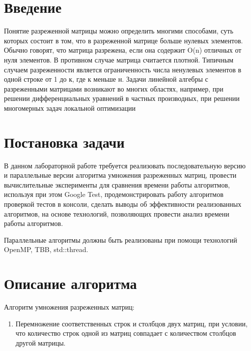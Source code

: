 \documentclass{report}
\begin{document}
\setcounter{page}{2}

\tableofcontents
\newpage

\section*{Введение}
\par Понятие разреженной матрицы можно определить многими способами, суть которых состоит в том, что в разреженной матрице больше нулевых элементов. Обычно говорят, что матрица разрежена, если она содержит  O(n) отличных от нуля элементов. В противном случае матрица считается плотной. Типичным случаем разреженности является ограниченность числа ненулевых элементов в одной строке от 1 до к, где к меньше н. Задачи линейной алгебры с разреженными матрицами возникают во многих областях, например, при решении дифференциальных уравнений в частных производных, при решении многомерных задач локальной оптимизации
\newpage

\section*{Постановка задачи}
\par В данном лабораторной работе требуется реализовать последовательную версию и параллельные версии алгоритма умножения разреженных матриц, провести вычислительные эксперименты для сравнения времени работы алгоритмов, используя при этом Google Test, продемонстрировать работу алгоритмов проверкой тестов в консоли, сделать выводы об эффективности реализованных алгоритмов, на основе технологий, позволяющих провести анализ времени работы алгоритмов.
\par Параллельные алгоритмы должны быть реализованы при помощи технологий OpenMP, TBB, std::thread.
\newpage

\section*{Описание алгоритма}
\par Алгоритм умножения разреженных матриц:
\begin{enumerate}
\item Перемножение соответственных строк и столбцов двух матриц, при условии, что количество строк одной из матриц совпадает с количеством столбцов другой матрицы.
\end{enumerate}
\newpage
\end{document}
